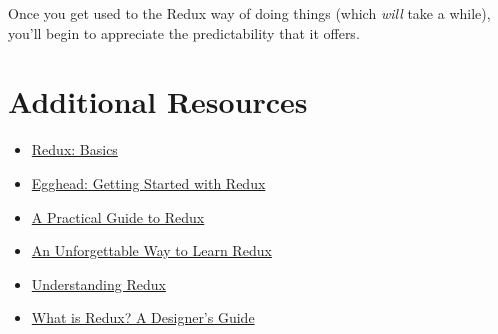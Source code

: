 Once you get used to the Redux way of doing things (which \textit{will} take a while), you'll begin to appreciate the predictability that it offers.


\section{Additional Resources}

\begin{itemize}[leftmargin=*]
    \item \href{https://redux.js.org/basics}{Redux: Basics}
    \item \href{https://egghead.io/courses/getting-started-with-redux}{Egghead: Getting Started with Redux}
    \item \href{https://lorenstewart.me/2016/11/27/a-practical-guide-to-redux/}{A Practical Guide to Redux}
    \item \href{https://levelup.gitconnected.com/an-unforgettable-way-to-learn-redux-f36afd38c966}{An Unforgettable Way to Learn Redux}
    \item \href{https://medium.freecodecamp.org/understanding-redux-the-worlds-easiest-guide-to-beginning-redux-c695f45546f6}{Understanding Redux}
    \item \href{https://www.smashingmagazine.com/2018/07/redux-designers-guide/}{What is Redux? A Designer's Guide}
\end{itemize}
